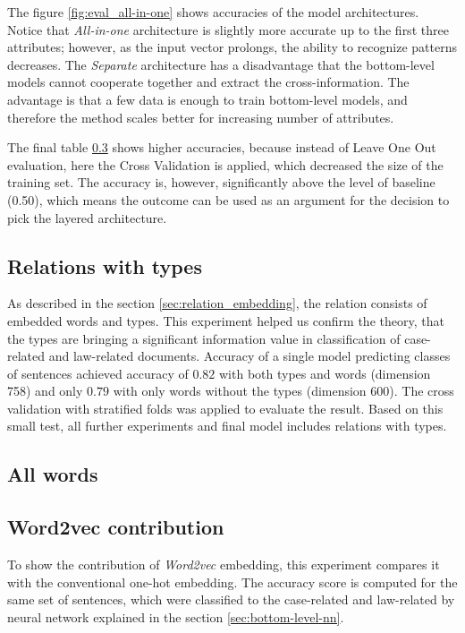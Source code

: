 \documentclass[
  digital, %
  notable,   %
  nolof,     %
  nolot,     %
  draft
]{fithesis3}
\begin{document}
The figure \ref{fig:eval_all-in-one} shows accuracies of the model architectures.
Notice that \textit{All-in-one} architecture is slightly more accurate up to the first three attributes; however, as the input vector prolongs, the ability to recognize patterns decreases.
The \textit{Separate} architecture has a disadvantage that the bottom-level models cannot cooperate together and extract the cross-information.
The advantage is that a few data is enough to train bottom-level models, and therefore the method scales better for increasing number of attributes.

The final table \ref{} shows higher accuracies, because instead of Leave One Out evaluation, here the Cross Validation is applied, which decreased the size of the training set. 
The accuracy is, however, significantly above the level of baseline (0.50), which means the outcome can be used as an argument for the decision to pick the layered architecture.

\subsection{Relations with types}
As described in the section \ref{sec:relation_embedding}, the relation consists of embedded words and types.
This experiment helped us confirm the theory, that the types are bringing a significant information value in classification of case-related and law-related documents.
Accuracy of a single model predicting classes of sentences achieved accuracy of $0.82$ with both types and words (dimension 758) and only $0.79$ with only words without the types (dimension 600).
The cross validation with stratified folds was applied to evaluate the result.
Based on this small test, all further experiments and final model includes relations with types.

\subsection{All words}

\subsection{Word2vec contribution}
To show the contribution of \textit{Word2vec} embedding, this experiment compares it with the conventional one-hot embedding.
The accuracy score is computed for the same set of sentences, which were classified to the case-related and law-related by neural network explained in the section \ref{sec:bottom-level-nn}.
\end{document}
